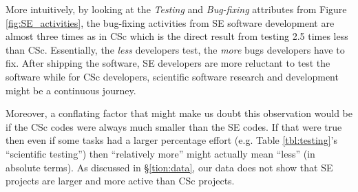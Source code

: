 \documentclass[conference,10pt]{IEEEtran}
\begin{document}
More intuitively, by looking at the \textit{Testing} and \textit{Bug-fixing} attributes from Figure \ref{fig:SE_activities}, the bug-fixing activities from SE software development are almost three times as in CSc which is the direct result from testing 2.5 times less than CSc. Essentially, the \textit{less} developers test, the \textit{more} bugs developers have to fix. After shipping the software, SE developers are more reluctant to test the software while for CSc developers, scientific software research and development might be a continuous journey.

Moreover, a conflating factor that might make us doubt this observation would be if the CSc codes were always much smaller than the SE codes. If that were true then even if some tasks had a larger percentage effort 
(e.g. Table \ref{tbl:testing}'s ``scientific testing'') then  ``relatively more'' might actually
mean ``less'' (in absolute terms). 
As discussed in \S\ref{tion:data}, our data does not show that  SE projects are larger and more active
than CSc projects.










 
\end{document}
